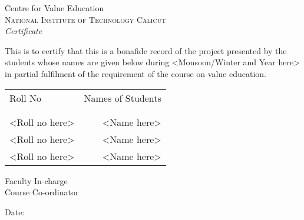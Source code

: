 \newpage
\thispagestyle{empty}

\begin{center}

\huge{Centre for Value Education}\\
\normalsize
\textsc{National Institute of Technology Calicut}\\[2.0cm]

\emph{\LARGE Certificate}\\[2.5cm]
\end{center}
\normalsize This is to certify that this is a bonafide record of the project presented by the students whose names are given below during <Monsoon/Winter and Year here> in partial fulfilment of the requirement of the course on value education.\\[1.0cm]

\begin{table}[h]
\centering
\begin{tabular}{lr}
Roll No & Names of Students \\ \\ \hline
\\
<Roll no here> & <Name here> \\ 
<Roll no here> & <Name here> \\
<Roll no here> & <Name here> \\
\end{tabular}
\end{table}

\vfill


\begin{flushright}
Faculty In-charge\\[1.5cm]
Course Co-ordinator\\[1.0cm]
\end{flushright}

\begin{flushleft}
Date:
\end{flushleft}
